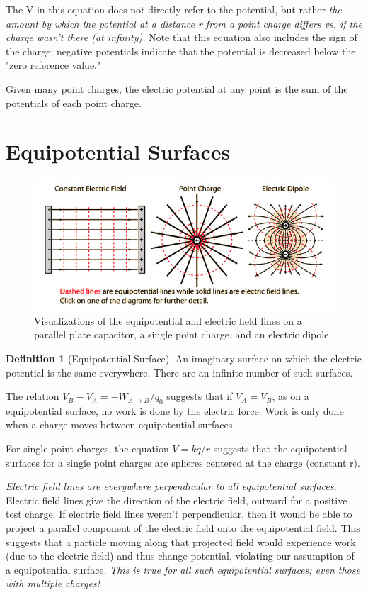 \documentclass[12pt, a4paper]{article}
\theoremstyle{definition}
\newtheorem{definition}{Definition}
\begin{document}
The V in this equation does not directly refer to the potential, but rather \textit{the amount by which the potential at a distance r from a point charge differs vs. if the charge wasn't there (at infinity).}
Note that this equation also includes the sign of the charge; negative potentials indicate that the potential is decreased below the "zero reference value."

Given many point charges, the electric potential at any point is the sum of the potentials of each point charge.

\newpage

\section{Equipotential Surfaces}
\begin{figure}
    \centering
    \includegraphics[width=1\textwidth]{equiv.jpg}
    \caption{Visualizations of the equipotential and electric field lines on a parallel plate capacitor, a single point charge, and an electric dipole.}
    \label{fig:equiv}
\end{figure}

\begin{definition}[Equipotential Surface]
    An imaginary surface on which the electric potential is the same everywhere.
    There are an infinite number of such surfaces.
\end{definition}

The relation $V_B - V_A = -W_{A \rightarrow B}/q_0$ suggests that if $V_A = V_B$, as on a equipotential surface, no work is done by the electric force.
Work is only done when a charge moves between equipotential surfaces.

For single point charges, the equation $V=kq/r$ suggests that the equipotential surfaces for a single point charges are spheres centered at the charge (constant r).

\textit{Electric field lines are everywhere perpendicular to all equipotential surfaces.}
Electric field lines give the direction of the electric field, outward for a positive test charge.
If electric field lines weren't perpendicular, then it would be able to project a parallel component of the electric field onto the equipotential field.
This suggests that a particle moving along that projected field would experience work (due to the electric field) and thus change potential, violating our assumption of a equipotential surface. 
\textit{This is true for all such equipotential surfaces; even those with multiple charges!}
\end{document}
